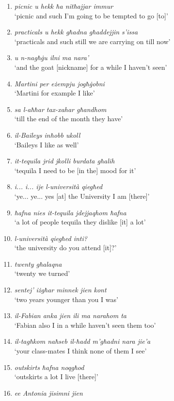 \documentclass[output=paper]{LSP/langsci}
\begin{document}
\begin{enumerate}
\item {\em  picnic u hekk ħa nitħajjar immur }\\
`picnic and such I’m going to be tempted to go [to]' 
\item {\em  practicals u hekk għadna għaddejjin s'issa}\\
`practicals and such still we are carrying on till now' 
\item {\em  u n-nagħġu ilni ma nara’}\\
`and the goat [nickname] for a while I haven’t seen' 
\item {\em  Martini per eżempju     jogħġobni}\\
`Martini for example I like' 
\item {\em  sa     l-aħħar     tax-xahar     għandhom}\\
`till the end of the month they have' 
\item {\em  il-Baileys inħobb  ukoll}\\
`Baileys I like as well' 
\item {\em  it-tequila jrid jkolli burdata għalih}\\
`tequila I need to be [in the] mood for it' 
\item {\em  i...     i... ije  l-università  qiegħed}\\
`ye... ye... yes [at] the University I am [there]' 
\item {\em  ħafna nies  it-tequila     jdejjaqhom ħafna}\\
`a lot of people tequila they dislike [it] a lot' 
\item {\em  l-università     qiegħed     inti?}\\
`the university do you attend [it]?' 
\item {\em  twenty għalaqna}\\
`twenty we turned' 
\item {\em  sentej' iżgħar     minnek     jien     kont}\\
`two years younger than you I was'
\item {\em  il-Fabian anka jien ili ma narahom ta}\\
`Fabian also I in a while haven’t seen them too' 
\item {\em  il-tagħkom naħseb  il-ħadd     m'għadni     nara     jie'a}\\
`your class-mates I think none of them I see' 
\item {\em  outskirts ħafna noqgħod}\\
`outskirts a lot I live [there]' 
\item {\em  ee Antonia jisimni jien}\\

\end{enumerate}
\end{document}
